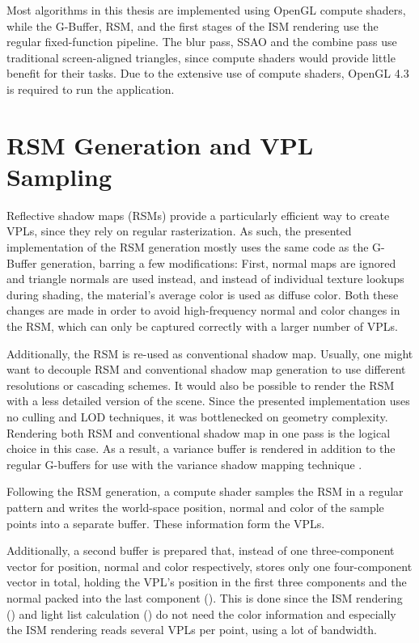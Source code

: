 Most algorithms in this thesis are implemented using OpenGL compute shaders, while the G-Buffer, RSM, and the first stages of the ISM rendering use the regular fixed-function pipeline. The blur pass, SSAO and the combine pass use traditional screen-aligned triangles, since compute shaders would provide little benefit for their tasks. Due to the extensive use of compute shaders, OpenGL 4.3 is required to run the application.


\section{RSM Generation and VPL Sampling}
\label{sec:impl:rsmAndVplSampling}

Reflective shadow maps (RSMs) provide a particularly efficient way to create VPLs, since they rely on regular rasterization. As such, the presented implementation of the RSM generation mostly uses the same code as the G-Buffer generation, barring a few modifications: First, normal maps are ignored and triangle normals are used instead, and instead of individual texture lookups during shading, the material's average color is used as diffuse color. Both these changes are made in order to avoid high-frequency normal and color changes in the RSM, which can only be captured correctly with a larger number of VPLs.

Additionally, the RSM is re-used as conventional shadow map. Usually, one might want to decouple RSM and conventional shadow map generation to use different resolutions or cascading schemes. It would also be possible to render the RSM with a less detailed version of the scene. Since the presented implementation uses no culling and LOD techniques, it was bottlenecked on geometry complexity. Rendering both RSM and conventional shadow map in one pass is the logical choice in this case. As a result, a variance buffer is rendered in addition to the regular G-buffers for use with the variance shadow mapping technique \citep{Donnelly:2006:VSM}.

Following the RSM generation, a compute shader samples the RSM in a regular pattern and writes the world-space position, normal and color of the sample points into a separate buffer. These information form the VPLs.

Additionally, a second buffer is prepared that, instead of one three-component vector for position, normal and color respectively, stores only one four-component vector in total, holding the VPL's position in the first three components and the normal packed into the last component (\citet{Cigolle:2014:NormalPacking}). This is done since the ISM rendering () and light list calculation () do not need the color information and especially the ISM rendering reads several VPLs per point, using a lot of bandwidth.


